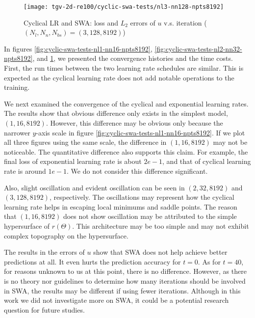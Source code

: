 \begin{figure}[hbt!]
    \centering%
    \texttt{[image: tgv-2d-re100/cyclic-swa-tests/nl3-nn128-npts8192]}%
    \caption[%
        Cyclical LR and SWA: loss and $L_2$ errors of $u$ v.s. iteration ($(N_l, N_n, N_{bs})=(3, 128, 8192)$)%
    ]{%
        Cyclical LR and SWA: loss and $L_2$ errors of $u$ v.s. iteration ($(N_l, N_n, N_{bs})=(3, 128, 8192)$)%
    }\label{fig:cyclic-swa-tests-nl3-nn128-npts8192}%
\end{figure}

In figures \ref{fig:cyclic-swa-tests-nl1-nn16-npts8192}, \ref{fig:cyclic-swa-tests-nl2-nn32-npts8192}, and \ref{fig:cyclic-swa-tests-nl3-nn128-npts8192}, we presented the convergence histories and the time costs.
First, the run times between the two learning rate schedules are similar.
This is expected as the cyclical learning rate does not add notable operations to the training.

We next examined the convergence of the cyclical and exponential learning rates.
The results show that obvious difference only exists in the simplest model, $(1, 16, 8192)$.
However, this difference may be obvious only because the narrower $y$-axis scale in figure \ref{fig:cyclic-swa-tests-nl1-nn16-npts8192}.
If we plot all three figures using the same scale, the difference in $(1, 16, 8192)$ may not be noticeable.
The quantitative difference also supports this claim.
For example, the final loss of exponential learning rate is about $2e-1$, and that of cyclical learning rate is around $1e-1$.
We do not consider this difference significant.

Also, slight oscillation and evident oscillation can be seen in $(2, 32, 8192)$ and $(3, 128, 8192)$, respectively. 
The oscillations may represent how the cyclical learning rate helps in escaping local minimums and saddle points. 
The reason that $(1, 16, 8192)$ does not show oscillation may be attributed to the simple hypersurface of $r(\Theta)$.
This architecture may be too simple and may not exhibit complex topography on the hypersurface.

The results in the errors of $u$ show that SWA does not help achieve better predictions at all.
It even hurts the prediction accuracy for $t=0$.
As for $t=40$, for reasons unknown to us at this point, there is no difference.
However, as there is no theory nor guidelines to determine how many iterations should be involved in SWA, the results may be different if using fewer iterations.
Although in this work we did not investigate more on SWA, it could be a potential research question for future studies.

